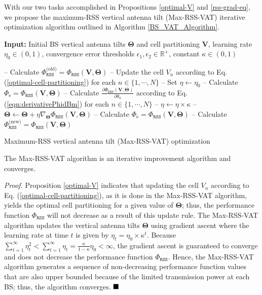 With our two tasks accomplished in Propositions \ref{optimal-V} and \ref{rss-grad-eq}, we propose the maximum-RSS vertical antenna tilt (Max-RSS-VAT) iterative optimization algorithm outlined in Algorithm \ref{BS_VAT_Algorithm}.

\begin{algorithm}[ht!]
\SetAlgoLined
{}
\textbf{Input:} Initial BS vertical antenna tilts $\mathbf{\Theta}$ and cell partitioning $\bm{V}$, learning rate $\eta_0\in (0,1)$, convergence error thresholds $\epsilon_1, \epsilon_2\in \mathbb{R}^+$, constant $\kappa \in (0, 1)$\;

{
-- Calculate  $\Phi_{\mathtt{RSS}}^{\textrm{(old)}} = \Phi_{\mathtt{RSS}}\left(\bm{V},\mathbf{\Theta}\right)$\;
-- Update the cell $V_n$ according to Eq. (\ref{optimal-cell-partitioning}) for each $n \in \{1, \cdots, N\}$\;
-- Set $\eta \gets \eta_0$\;
{
-- Calculate  $\Phi_{\textrm{s}} = \Phi_{\mathtt{RSS}}\left(\bm{V},\mathbf{\Theta}\right)$\;
-- Calculate $\frac{\partial \Phi_{\mathtt{RSS}}(\mathbf{V},\mathbf{\Theta})}{\partial \theta_n}$ according to Eq. (\ref{eqn:derivativePhidBm}) for each $n \in \{1, \cdots, N\}$\;
-- $\eta \gets \eta \times \kappa$\;
-- $\mathbf{\Theta} \gets \mathbf{\Theta} + \eta \nabla_{\mathbf{\Theta}} \Phi_{\mathtt{RSS}}(\bm{V},\mathbf{\Theta})$\;
-- Calculate $\Phi_{\textrm{e}} = \Phi_{\mathtt{RSS}}\left(\bm{V},\mathbf{\Theta}\right)$\;
}
-- Calculate  $\Phi_{\mathtt{RSS}}^{\textrm{(new)}} = \Phi_{\mathtt{RSS}}\left(\bm{V},\mathbf{\Theta}\right)$\;
}
 \caption{Maximum-RSS vertical antenna tilt (Max-RSS-VAT) optimization}
 \label{BS_VAT_Algorithm}
\end{algorithm}

\begin{Proposition}\label{BS-VAT-convergence}
The Max-RSS-VAT algorithm is an iterative improvement algorithm and converges.
\end{Proposition}
\textit{Proof. }Proposition \ref{optimal-V} indicates that updating the cell $V_n$ according to Eq. (\ref{optimal-cell-partitioning}), as it is done in the Max-RSS-VAT algorithm, yields the optimal cell partitioning for a given value of $\bm{\Theta}$; thus, the performance function $\Phi_{\mathtt{RSS}}$ will not decrease as a result of this update rule. The Max-RSS-VAT algorithm updates the vertical antenna tilts $\bm{\Theta}$ using gradient ascent where the learning rate at time $t$ is given by $\eta_t = \eta_0 \times \kappa^t$. Because $\sum_{t=1}^{\infty}\eta^2_t < \sum_{t=1}^{\infty}\eta_t = \frac{\kappa}{1 - \kappa}\eta_0 < \infty$, the gradient ascent is guaranteed to converge \cite{goodfellow2016deep} and does not decrease the performance function $\Phi_{\mathtt{RSS}}$. Hence, the Max-RSS-VAT algorithm generates a sequence of non-decreasing performance function values that are also upper bounded because of the limited transmission power at each BS; thus, the algorithm converges.  $\hfill\blacksquare$